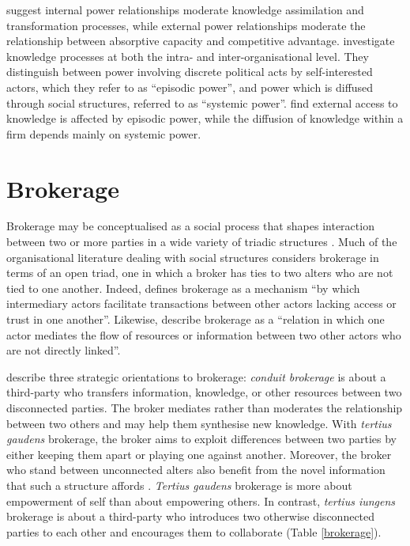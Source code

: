 \citet{todorova2007absorptive} suggest internal power relationships moderate knowledge assimilation and transformation processes, while external power relationships moderate the relationship between absorptive capacity and competitive advantage. \citet{easterby2008absorptive} investigate knowledge processes at both the intra- and inter-organisational level. They distinguish between power involving discrete political acts by self-interested actors, which they refer to as \enquote{episodic power}, and power which is diffused through social structures, referred to as \enquote{systemic power}. \citet{easterby2008absorptive} find external access to knowledge is affected by episodic power, while the diffusion of knowledge within a firm depends mainly on systemic power. \medskip


\section{Brokerage}

Brokerage may be conceptualised as a social process that shapes interaction between two or more parties in a wide variety of triadic structures \citep{obstfeld2002knowledge}. Much of the organisational literature dealing with social structures considers brokerage in terms of an open triad, one in which a broker has ties to two alters who are not tied to one another. Indeed, \citet{marsden1982brokerage} defines brokerage as a mechanism \enquote{by which intermediary actors facilitate transactions between other actors lacking access or trust in one another}. Likewise, \citet{fernandez1994dilemma} describe brokerage as a \enquote{relation in which one actor mediates the flow of resources or information between two other actors who are not directly linked}. \medskip

\citet{obstfeld2014brokerage} describe three strategic orientations to brokerage: \emph{conduit brokerage} is about a third-party who transfers information, knowledge, or other resources between two disconnected parties. The broker mediates rather than moderates the relationship between two others and may help them synthesise new knowledge. With \emph{tertius gaudens} brokerage, the broker aims to exploit differences between two parties by either keeping them apart or playing one against another. Moreover, the broker who stand between unconnected alters also benefit from the novel information that such a structure affords \citep{burt1992structural}. \emph{Tertius gaudens} brokerage is more about empowerment of self than about empowering others. In contrast, \emph{tertius iungens} brokerage is about a third-party who introduces two otherwise disconnected parties to each other and encourages them to collaborate (Table \ref{brokerage}). \medskip 

